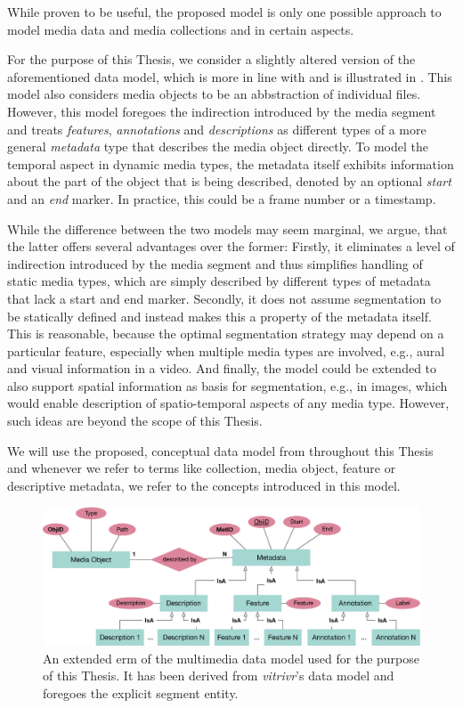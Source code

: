 While proven to be useful, the proposed model is only one possible approach to model media data and media collections and in  certain aspects. 

For the purpose of this Thesis, we consider a slightly altered version of the aforementioned data model, which is more in line with \cite{Blanken:2007multimedia} and is illustrated in . This model also considers media objects to be an abbstraction of individual files. However, this model foregoes the indirection introduced by the media segment and treats \emph{features}, \emph{annotations} and \emph{descriptions} as different types of a more general \emph{metadata} type that describes the media object directly. To model the temporal aspect in dynamic media types, the metadata itself exhibits information about the part of the object that is being described, denoted by an optional \emph{start} and an \emph{end} marker. In practice, this could be a frame number or a timestamp.

While the difference between the two models may seem marginal, we argue, that the latter offers several advantages over the former: Firstly, it eliminates a level of indirection introduced by the media segment and thus simplifies handling of static media types, which are simply described by different types of metadata that lack a start and end marker. Secondly, it does not assume segmentation to be statically defined and instead makes this a property of the metadata itself. This is reasonable, because the optimal segmentation strategy may depend on a particular feature, especially when multiple media types are involved, e.g., aural and visual information in a video. And finally, the model could be extended to also support spatial information as basis for segmentation, e.g., in images, which would enable description of spatio-temporal aspects of any media type. However, such ideas are beyond the scope of this Thesis. 

We will use the proposed, conceptual data model from  throughout this Thesis and whenever we refer to terms like collection, media object, feature or descriptive metadata, we refer to the concepts introduced in this model.

\begin{figure}[bt]
    \centering
    \includegraphics[width=\textwidth]{figures/erm-media-data}
    \caption{An extended \acrshort{erm} of the multimedia data model used for the purpose of this Thesis. It has been derived from \emph{vitrivr}'s data model and foregoes the explicit segment entity.}
    \label{figure:erm_mediadata}
\end{figure}

